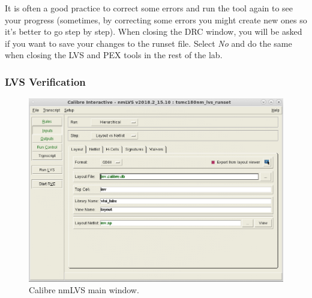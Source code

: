 \begin{enumerate}
	\begin{remark}
		It is often a good practice to correct some errors and run the tool again to see your progress (sometimes, by correcting some errors you might create new ones so it's better to go step by step). \newline
		When closing the DRC window, you will be asked if you want to save your changes to the runset file. Select \textit{No} and do the same when closing the LVS and PEX tools in the rest of the lab.
	\end{remark}
	
\end{enumerate}

\subsubsection{LVS Verification}

\begin{figure}
	\vspace{-0mm}
	\centering
	\vspace{1cm}
	\includegraphics[scale=0.25]{figures/lab2_layout/lvs_main}
	\caption{Calibre nmLVS main window.}
	\label{fig_lvsmain}
\end{figure}

